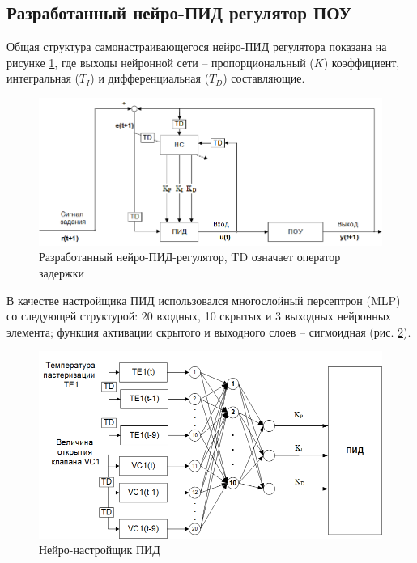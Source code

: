 \subsection{Разработанный нейро-ПИД регулятор ПОУ}

Общая структура самонастраивающегося нейро-ПИД регулятора показана на рисунке \ref{fig:neuro_PID_controller}, где выходы нейронной сети – пропорциональный ($K$) коэффициент, интегральная ($T_I$) и дифференциальная ($T_D$) составляющие.

\begin{figure}[H]
    \centering
    \includegraphics[width=\textwidth]{images/chapter_2/Разработанный нейро-контроллер.png}
    \caption{Разработанный нейро-ПИД-регулятор, TD означает оператор задержки}
    \label{fig:neuro_PID_controller}
\end{figure}

В качестве настройщика ПИД использовался многослойный персептрон (MLP) со следующей структурой: 20 входных, 10 скрытых и 3 выходных нейронных элемента; функция активации скрытого и выходного слоев – сигмоидная (рис. \ref{fig:PID_neuro_tuner}).

\begin{figure}[H]
    \centering
    \includegraphics[width=\textwidth]{images/chapter_2/Нейро-настройщик ПИД.png}
    \caption{Нейро-настройщик ПИД}
    \label{fig:PID_neuro_tuner}
\end{figure}

